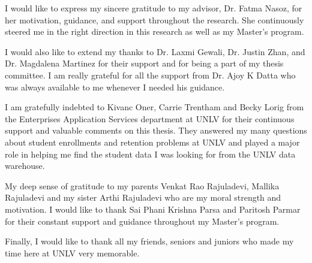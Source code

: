 \documentclass[11pt,openright]{report}
\begin{document}


\begin{thesisacknowledgments}
I would like to express my sincere gratitude to my advisor, Dr. Fatma Nasoz, for her motivation, guidance, and support throughout the research. She continuously steered me in the right direction in this research as well as my Master's program.

I would also like to extend my thanks to Dr. Laxmi Gewali, Dr. Justin Zhan, and Dr. Magdalena Martinez for their support and for being a part of my thesis committee. I am really grateful for all the support from Dr. Ajoy K Datta who was always available to me whenever I needed his guidance.

I am gratefully indebted to Kivanc Oner, Carrie Trentham and Becky Lorig from the Enterprises Application Services department at UNLV for their continuous support and valuable comments on this thesis. They answered my many questions about student enrollments and retention problems at UNLV and played a major role in helping me find the student data I was looking for from the UNLV data warehouse.

My deep sense of gratitude to my parents Venkat Rao Rajuladevi, Mallika Rajuladevi and my sister Arthi Rajuladevi who are my moral strength and motivation. I would like to thank Sai Phani Krishna Parsa and Paritosh Parmar for their constant support and guidance throughout my Master's program.

Finally, I would like to thank all my friends, seniors and juniors who made my time here at UNLV very memorable. 
\end{thesisacknowledgments}

\pagestyle{plain}

\tableofcontents
\clearpage
\listoftables
\clearpage
\listoffigures
\clearpage
\listofalgorithmes
\clearpage
\end{document}
